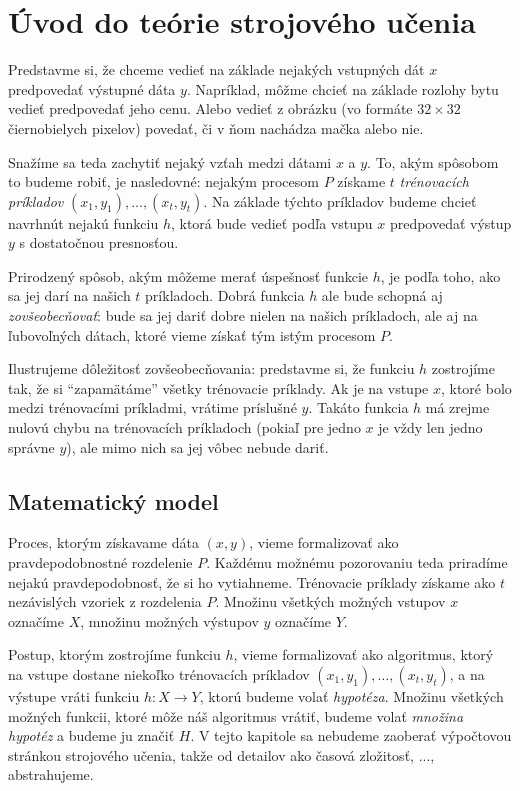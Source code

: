 \chapter{Úvod do teórie strojového učenia}

Predstavme si, že chceme vedieť na základe nejakých vstupných dát $x$
predpovedať výstupné dáta $y$. Napríklad, môžme chcieť na základe rozlohy
bytu vedieť predpovedať jeho cenu. Alebo vedieť z obrázku (vo formáte
$32 \times 32$ čiernobielych pixelov) povedať, či v ňom nachádza mačka
alebo nie.

Snažíme sa teda zachytiť nejaký vzťah medzi dátami $x$ a $y$. To, akým
spôsobom to budeme robiť, je nasledovné: nejakým procesom $P$ získame $t$
\emph{trénovacích príkladov} $(x_1, y_1), \ldots, (x_t, y_t)$. Na základe
týchto príkladov budeme chcieť navrhnút nejakú funkciu $h$, ktorá bude
vedieť podľa vstupu $x$ predpovedať výstup $y$ s dostatočnou presnosťou.

Prirodzený spôsob, akým môžeme merať úspešnosť funkcie $h$, je podľa
toho, ako sa jej darí na našich $t$ príkladoch. Dobrá funkcia $h$ ale
bude schopná aj \emph{zovšeobecňovať}: bude sa jej dariť dobre nielen
na našich príkladoch, ale aj na ľubovoľných dátach, ktoré vieme získať
tým istým procesom $P$.

Ilustrujeme dôležitosť zovšeobecňovania: predstavme si, že funkciu $h$ 
zostrojíme tak, že si ``zapamätáme'' všetky trénovacie príklady. Ak je 
na vstupe $x$, ktoré bolo medzi trénovacími príkladmi, vrátime 
príslušné $y$. Takáto funkcia $h$ má zrejme nulovú chybu na trénovacích 
príkladoch (pokiaľ pre jedno $x$ je vždy len jedno správne $y$), ale 
mimo nich sa jej vôbec nebude dariť.




\section{Matematický model}

Proces, ktorým získavame dáta $(x, y)$, vieme formalizovať ako
pravdepodobnostné rozdelenie $P$. Každému možnému pozorovaniu teda
priradíme nejakú pravdepodobnosť, že si ho vytiahneme. Trénovacie
príklady získame ako $t$ nezávislých vzoriek z rozdelenia $P$.
Množinu všetkých možných vstupov $x$ označíme $X$, množinu možných
výstupov $y$ označíme $Y$.

Postup, ktorým zostrojíme funkciu $h$, vieme formalizovať ako algoritmus,
ktorý na vstupe dostane niekoľko trénovacích príkladov
$(x_1, y_1), \ldots, (x_t, y_t)$, a na výstupe vráti funkciu $h : X \to Y$,
ktorú budeme volať \emph{hypotéza}. Množinu všetkých možných funkcii,
ktoré môže náš algoritmus vrátiť, budeme volať \emph{množina hypotéz}
a budeme ju značiť $H$. V tejto kapitole sa nebudeme zaoberať výpočtovou stránkou
strojového učenia, takže od detailov ako časová zložitosť, ..., abstrahujeme.


